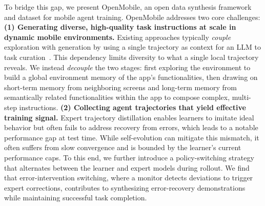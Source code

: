 \documentclass{article} %
\begin{document}
To bridge this gap,
we present OpenMobile, an open data synthesis framework and dataset for mobile agent training.
OpenMobile addresses two core challenges: 
\textbf{(1) Generating diverse, high-quality task instructions at scale in dynamic mobile environments.}
Existing approaches typically \emph{couple} exploration with generation by using a single trajectory as context for an LLM to task curation~\citep{sun2025genesis, murty2024nnetnav}. This dependency limits diversity to what a single local trajectory reveals.
We instead \emph{decouple} the two stages: first exploring the environment to build a global environment memory of the app's functionalities, then drawing on short-term memory from neighboring screens and long-term memory from semantically related functionalities within the app to compose complex, multi-step instructions.
\textbf{(2) Collecting agent trajectories that yield effective training signal.}
Expert trajectory distillation enables learners to imitate ideal behavior but often fails to address recovery from errors, 
which leads to a notable performance gap at test time. 
While self-evolution can mitigate this mismatch, it often suffers from slow convergence and is bounded by the learner's current performance caps.
To this end, 
we further introduce a policy-switching strategy that alternates between the learner and expert models during rollout. We find that error-intervention switching, where a monitor detects deviations to trigger expert corrections,
contributes to synthesizing error-recovery demonstrations while maintaining successful task completion.
\end{document}
